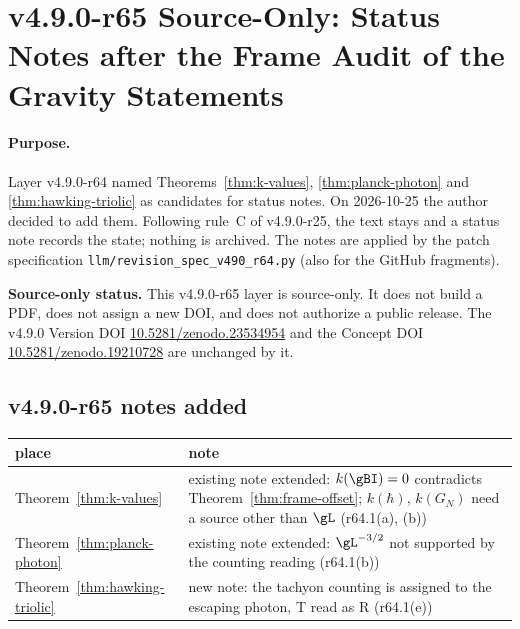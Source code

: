 \clearpage
\section*{v4.9.0-r65 Source-Only: Status Notes after the Frame Audit of the Gravity Statements}
\label{sec:v490-r65-gravity-status-notes}

\paragraph{Purpose.}
Layer v4.9.0-r64 named Theorems~\ref{thm:k-values}, \ref{thm:planck-photon} and \ref{thm:hawking-triolic} as candidates for status notes.  On 2026-10-25 the author
decided to add them.  Following rule~C of v4.9.0-r25, the text stays and a status note records the state; nothing is archived.  The notes are applied by the patch
specification \texttt{llm/revision\_spec\_v490\_r64.py} (also for the GitHub fragments).

\noindent\textbf{Source-only status.}
This v4.9.0-r65 layer is source-only.  It does not build a PDF, does not assign a new DOI,
and does not authorize a public release.  The v4.9.0 Version DOI
\href{https://doi.org/10.5281/zenodo.23534954}{10.5281/zenodo.23534954} and the Concept DOI
\href{https://doi.org/10.5281/zenodo.19210728}{10.5281/zenodo.19210728} are unchanged by it.

\subsection*{v4.9.0-r65 notes added}
\label{subsec:v490-r65-notes}

\begin{center}
\small
\begin{tabular}{@{}>{\raggedright\arraybackslash}p{}>{\raggedright\arraybackslash}p{}@{}}
\toprule
place & note\\
\midrule
Theorem~\ref{thm:k-values} & existing note extended: \(k(\gBI)=0\) contradicts Theorem~\ref{thm:frame-offset}; \(k(\hbar)\), \(k(G_N)\) need a source other than \(\gL\) (r64.1(a), (b))\\
Theorem~\ref{thm:planck-photon} & existing note extended: \(\gL^{-3/2}\) not supported by the counting reading (r64.1(b))\\
Theorem~\ref{thm:hawking-triolic} & new note: the tachyon counting is assigned to the escaping photon, T read as R (r64.1(e))\\
\bottomrule
\end{tabular}
\end{center}

